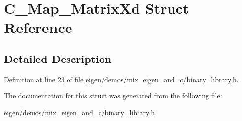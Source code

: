 \hypertarget{struct_c___map___matrix_xd}{}\section{C\+\_\+\+Map\+\_\+\+Matrix\+Xd Struct Reference}
\label{struct_c___map___matrix_xd}


\subsection{Detailed Description}


Definition at line \hyperlink{eigen_2demos_2mix__eigen__and__c_2binary__library_8h_source_l00023}{23} of file \hyperlink{eigen_2demos_2mix__eigen__and__c_2binary__library_8h_source}{eigen/demos/mix\+\_\+eigen\+\_\+and\+\_\+c/binary\+\_\+library.\+h}.



The documentation for this struct was generated from the following file\+:\begin{DoxyCompactItemize}
\item 
eigen/demos/mix\+\_\+eigen\+\_\+and\+\_\+c/binary\+\_\+library.\+h\end{DoxyCompactItemize}
